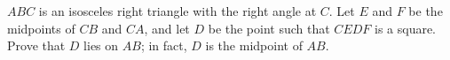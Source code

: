 $ABC$ is an isosceles right triangle with the right angle at $C$. Let $E$ and $F$ be the midpoints of $CB$ and $CA$, and let $D$ be the point such that $CEDF$ is a square. Prove that $D$ lies on $AB$; in fact, $D$ is the midpoint of $AB$.
